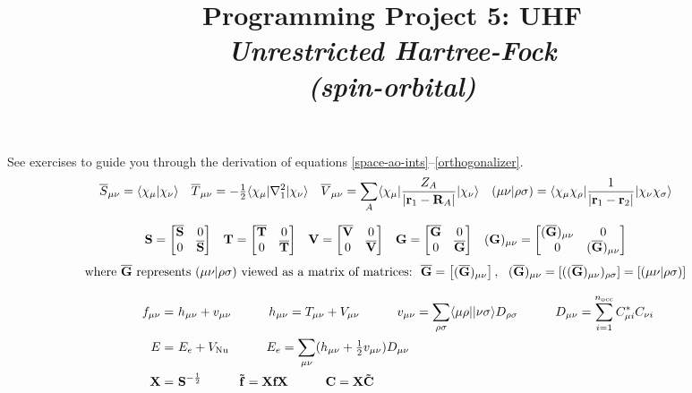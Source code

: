 \documentclass[fleqn]{article}
\title{Programming Project 5: UHF\\
\textit{Unrestricted Hartree-Fock\\(spin-orbital)}}
\author{}
\date{}
\begin{document}
\maketitle
\noindent
See exercises to guide you through the derivation of equations \ref{space-ao-ints}--\ref{orthogonalizer}.\\

\noindent
{}
\begin{align}
\label{space-ao-ints}
&
  \overline{S}_{\mu\nu}
=
  \langle\chi_{\mu}|\chi_{\nu}\rangle
&&
  \overline{T}_{\mu\nu}
=
  -\tfrac{1}{2}\langle\chi_{\mu}|\nabla_1^2|\chi_{\nu}\rangle
&&
  \overline{V}_{\mu\nu}
=
  \sum_A\langle\chi_{\mu}|\dfrac{Z_A}{|\mathbf{r}_1-\mathbf{R}_A|}|\chi_{\nu}\rangle
&&
  (\mu\nu|\rho\sigma)
=
  \langle\chi_\mu\chi_\rho|\dfrac{1}{|\mathbf{r}_1-\mathbf{r}_2|}|\chi_\nu\chi_\sigma\rangle
\end{align}


\noindent
{}
\begin{align}
\label{spin-ao-ints-1}
&
  \mathbf{S}
=
  \begin{bmatrix}\overline{\mathbf{S}}&0\\0&\overline{\mathbf{S}}\end{bmatrix}
&&
  \mathbf{T}
=
  \begin{bmatrix}\overline{\mathbf{T}}&0\\0&\overline{\mathbf{T}}\end{bmatrix}
&&
  \mathbf{V}
=
  \begin{bmatrix}\overline{\mathbf{V}}&0\\0&\overline{\mathbf{V}}\end{bmatrix}
&&
  \mathbf{G}
=
  \begin{bmatrix}\overline{\mathbf{G}}&0\\0&\overline{\mathbf{G}}\end{bmatrix}
&&
  (\mathbf{G})_{\mu\nu}
=
  \begin{bmatrix}(\overline{\mathbf{G}})_{\mu\nu}&0\\0&(\overline{\mathbf{G}})_{\mu\nu}\end{bmatrix}
\end{align}
\begin{align}
\label{spin-ao-ints-2}
&
\text{where $\ol{\bo{G}}$ represents $(\mu\nu|\rho\si)$ viewed as a matrix of matrices:}
\ \ 
  \ol{\bo{G}}
=
  \ma{(\ol{\bo{G}})_{\mu\nu}},
\ \ 
  (\ol{\bo{G}})_{\mu\nu}
=
  [((\ol{\bo{G}})_{\mu\nu})_{\rho\si}]
=
  [(\mu\nu|\rho\si)]
\end{align}


\noindent
{}
\begin{align}
\label{fock-matrix}
&&
  f_{\mu\nu}
=&\
  h_{\mu\nu}
+
  v_{\mu\nu}
\hspace{30pt}
  h_{\mu\nu}
=
  T_{\mu\nu}+V_{\mu\nu}
\hspace{30pt}
  v_{\mu\nu}
=
  \sum_{\rho\sigma}
  \langle\mu\rho||\nu\sigma\rangle
  D_{\rho\sigma}
\hspace{30pt}
  D_{\mu\nu}
=
  \sum_{i=1}^{n_\text{occ}}
  C_{\mu i}^* C_{\nu i}
\\
\label{energy}
&&
  E
=&\
  E_e
+
  V_\mathrm{Nu}
\hspace{30pt}
  E_e
=
  \sum_{\mu\nu}
  (h_{\mu\nu}+\tfrac{1}{2}v_{\mu\nu})D_{\mu\nu}
\\
\label{orthogonalizer}
&&
  \mathbf{X}
=&\
  \mathbf{S}^{-\frac{1}{2}}
\hspace{30pt}
  \mathbf{\tilde{f}}
=
  \mathbf{X}\mathbf{f}\mathbf{X}
\hspace{30pt}
  \mathbf{C}
=
  \mathbf{X}
  \mathbf{\tilde{C}}
\end{align}
\end{document}

